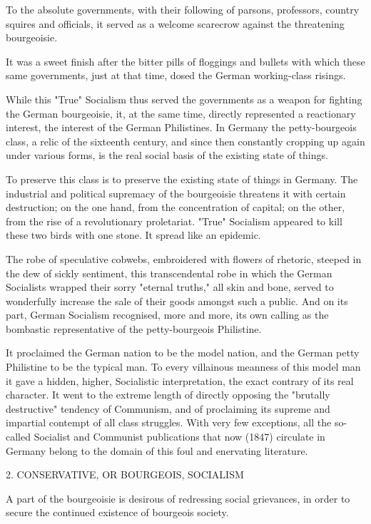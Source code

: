 \documentclass[11pt]{book}
\begin{document}
To the absolute governments, with their following of parsons,
professors, country squires and officials, it served as a welcome
scarecrow against the threatening bourgeoisie.

It was a sweet finish after the bitter pills of floggings and
bullets with which these same governments, just at that time,
dosed the German working-class risings.

While this "True" Socialism thus served the governments as a
weapon for fighting the German bourgeoisie, it, at the same time,
directly represented a reactionary interest, the interest of the
German Philistines.  In Germany the petty-bourgeois class, a
relic of the sixteenth century, and since then constantly
cropping up again under various forms, is the real social basis
of the existing state of things.

To preserve this class is to preserve the existing state of
things in Germany.  The industrial and political supremacy of the
bourgeoisie threatens it with certain destruction; on the one
hand, from the concentration of capital; on the other, from the
rise of a revolutionary proletariat.  "True" Socialism appeared to
kill these two birds with one stone.  It spread like an epidemic.

The robe of speculative cobwebs, embroidered with flowers
of rhetoric, steeped in the dew of sickly sentiment, this
transcendental robe in which the German Socialists wrapped their
sorry "eternal truths," all skin and bone, served to wonderfully
increase the sale of their goods amongst such a public.  And on
its part, German Socialism recognised, more and more, its own
calling as the bombastic representative of the petty-bourgeois
Philistine.

It proclaimed the German nation to be the model nation, and the
German petty Philistine to be the typical man.  To every
villainous meanness of this model man it gave a hidden, higher,
Socialistic interpretation, the exact contrary of its real
character.  It went to the extreme length of directly opposing
the "brutally destructive" tendency of Communism, and of
proclaiming its supreme and impartial contempt of all class
struggles.  With very few exceptions, all the so-called Socialist
and Communist publications that now (1847) circulate in Germany
belong to the domain of this foul and enervating literature.


2. CONSERVATIVE, OR BOURGEOIS, SOCIALISM

A part of the bourgeoisie is desirous of redressing social
grievances, in order to secure the continued existence of
bourgeois society.
\end{document}
